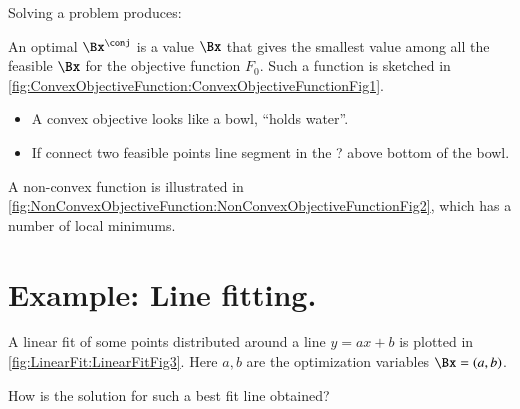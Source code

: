 Solving a problem produces:

An optimal \(\Bx^\conj\) is a value \( \Bx \) that gives the smallest value among all the feasible \( \Bx \) for the objective function \( F_0 \).  Such a function is sketched in \cref{fig:ConvexObjectiveFunction:ConvexObjectiveFunctionFig1}.


\begin{itemize}
\item A convex objective looks like a bowl, ``holds water''.
\item If connect two feasible points line segment in the ? above bottom of the bowl.
\end{itemize}

A non-convex function is illustrated in \cref{fig:NonConvexObjectiveFunction:NonConvexObjectiveFunctionFig2}, which has a number of local minimums.


\section{Example: Line fitting.}

A linear fit of some points distributed around a line \( y = a x + b \) is plotted in \cref{fig:LinearFit:LinearFitFig3}.  Here \( a, b \) are the optimization variables \( \Bx = (a, b) \).


How is the solution for such a best fit line obtained?

